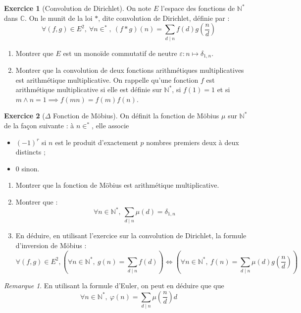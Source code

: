 \documentclass[french]{book}
\newcommand{\N}{\mathbb{N}}
\newcommand{\C}{\mathbb{C}}
\newcommand{\st}{^*}
\theoremstyle{definition}
\newtheorem{ex}{Exercice}[chapter]
\theoremstyle{theorem}
\theoremstyle{remark}
\newtheorem*{rmq}{Remarque}
\begin{document}
\begin{ex}[Convolution de Dirichlet]
	On note $E$ l'espace des fonctions de $\N\st$ dans $\C$. On le munit de la loi $*$, dite convolution de Dirichlet, définie par : $$\forall (f,g)\in E^2,\ \forall n\in\st,\ (f*g)(n)=\sum_{d\mid n}f(d)g\left(\frac{n}{d}\right)$$
	\begin{enumerate}
		\item Montrer que $E$ est un monoïde commutatif de neutre $\varepsilon:n\mapsto\delta_{1,n}$.
		\item Montrer que la convolution de deux fonctions arithmétiques multiplicatives est arithmétique multiplicative. On rappelle qu'une fonction $f$ est arithmétique multiplicative si elle est définie sur $\N\st$, si $f(1)=1$ et si $m\wedge n=1\implies f(mn)=f(m)f(n)$.
	\end{enumerate}
\end{ex}

\begin{ex}[$\Delta$ Fonction de Möbius]
	On définit la fonction de Möbius $\mu$ sur $\N\st$ de la façon suivante : à $n\in\st$, elle associe
	\begin{itemize} 
		\item $(-1)^r$ si $n$ est le produit d'exactement $p$ nombres premiers deux à deux distincts ;
		\item $0$ sinon. 
	\end{itemize}
	\begin{enumerate}
		\item Montrer que la fonction de Möbius est arithmétique multiplicative.
		\item Montrer que : $$\forall n\in\N\st,\ \sum_{d\mid n}\mu(d)=\delta_{1,n}$$
		\item En déduire, en utilisant l'exercice sur la convolution de Dirichlet, la formule d'inversion de Möbius : $$\forall(f,g)\in E^2, \left(\forall n\in\N\st,\ g(n)=\sum_{d\mid n}f(d)\right)\iff\left(\forall n\in\N\st,\ f(n)=\sum_{d\mid n}\mu(d)g\left(\frac{n}{d}\right)\right)$$
	\end{enumerate}
\end{ex}

\begin{rmq}
	En utilisant la formule d'Euler, on peut en déduire que que $$\forall n\in\N\st,\ \varphi(n)=\sum_{d\mid n}\mu\left(\frac{n}{d}\right)d$$
\end{rmq}
\end{document}
